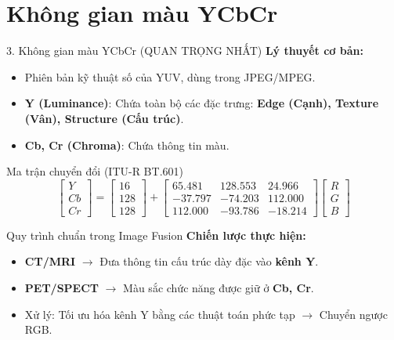 \documentclass{beamer}
\begin{document}
\section{Không gian màu YCbCr}

\begin{frame}{3. Không gian màu YCbCr (QUAN TRỌNG NHẤT)}
    \textbf{Lý thuyết cơ bản:}
    \begin{itemize}
        \item Phiên bản kỹ thuật số của YUV, dùng trong JPEG/MPEG.
        \item \textbf{Y (Luminance)}: Chứa toàn bộ các đặc trưng: \textbf{Edge (Cạnh), Texture (Vân), Structure (Cấu trúc)}.
        \item \textbf{Cb, Cr (Chroma)}: Chứa thông tin màu.
    \end{itemize}

    \begin{block}{Ma trận chuyển đổi (ITU-R BT.601)}
    \begin{equation*}
    \begin{bmatrix} Y \\ Cb \\ Cr \end{bmatrix} = \begin{bmatrix} 16 \\ 128 \\ 128 \end{bmatrix} + \begin{bmatrix} 65.481 & 128.553 & 24.966 \\ -37.797 & -74.203 & 112.000 \\ 112.000 & -93.786 & -18.214 \end{bmatrix} \begin{bmatrix} R \\ G \\ B \end{bmatrix}
    \end{equation*}
    \end{block}
\end{frame}

\begin{frame}{Quy trình chuẩn trong Image Fusion}
    \vspace{0.3cm}
    \textbf{Chiến lược thực hiện:}
    \begin{itemize}
        \item \textbf{CT/MRI} $\to$ Đưa thông tin cấu trúc dày đặc vào \textbf{kênh Y}.
        \item \textbf{PET/SPECT} $\to$ Màu sắc chức năng được giữ ở \textbf{Cb, Cr}.
        \item Xử lý: Tối ưu hóa kênh Y bằng các thuật toán phức tạp $\to$ Chuyển ngược RGB.
    \end{itemize}
\end{frame}
\end{document}

